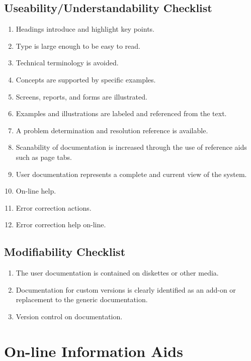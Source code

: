  \section {Useability/Understandability Checklist}
 \begin{enumerate}
  \item Headings introduce and highlight key points.
  \item Type is large enough to be easy to read.
  \item Technical terminology is avoided.
  \item Concepts are supported by specific examples.
  \item Screens, reports, and forms are illustrated.
  \item Examples and illustrations are labeled and referenced from
    the text.
  \item A problem determination and resolution reference is available.
  \item Scanability of documentation is increased through the use of
    reference aids such as page tabs.
  \item User documentation represents a complete and current view
    of the system.
  \item On-line help.
  \item Error correction actions.
  \item Error correction help on-line.
 \end{enumerate}
 \section {Modifiability Checklist}
 \begin {enumerate}
  \item The user documentation is contained on diskettes or other media.
  \item Documentation for custom versions is clearly identified as an
    add-on or replacement to the generic documentation.
  \item Version control on documentation.
 \end {enumerate}
\chapter {On-line Information Aids}
